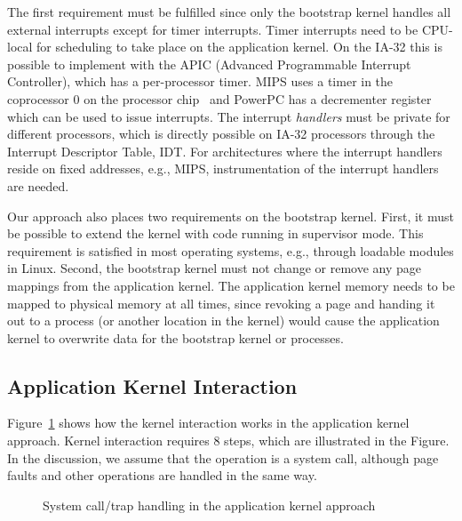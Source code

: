 The first requirement must be fulfilled since only the bootstrap kernel
handles all external interrupts except for timer interrupts. Timer interrupts
need to be CPU-local for scheduling to take place on the application kernel.
On the IA-32 this is possible to implement with the APIC (Advanced
Programmable Interrupt Controller), which has a per-processor timer.
\label{fix:local_timer}MIPS uses a timer in the coprocessor 0 on the processor
chip~\cite{mips01programmers} and PowerPC has a decrementer
register~\cite{ppcrefman} which can be used to issue interrupts.  The
interrupt \emph{handlers} must be private for different processors, which is
directly possible on IA-32 processors through the Interrupt Descriptor Table,
IDT. For architectures where the interrupt handlers reside on fixed addresses,
e.g., MIPS, instrumentation of the interrupt handlers are needed.

Our approach also places two requirements on the bootstrap kernel. First, it
must be possible to extend the kernel with code running in supervisor mode.
This requirement is satisfied in most operating systems, e.g., through
loadable modules in Linux. Second, the bootstrap kernel must not change or
remove any page mappings from the application kernel. The application kernel
memory needs to be mapped to physical memory at all times, since revoking a
page and handing it out to a process (or another location in the kernel) would
cause the application kernel to overwrite data for the bootstrap kernel or
processes.



\subsection{Application Kernel Interaction}
\label{sec:appkern:trap_handling}

Figure~\ref{fig:trap} shows how the kernel interaction works in the application
kernel approach. Kernel interaction requires 8 steps, which are illustrated in
the Figure. In the discussion, we assume that the operation is a system call,
although page faults and other operations are handled in the same way.

\begin{figure}
  \begin{center}
  \end{center}
  \caption[System call and trap handling]{System call/trap handling in the application kernel approach}
  \label{fig:trap}
\end{figure}

